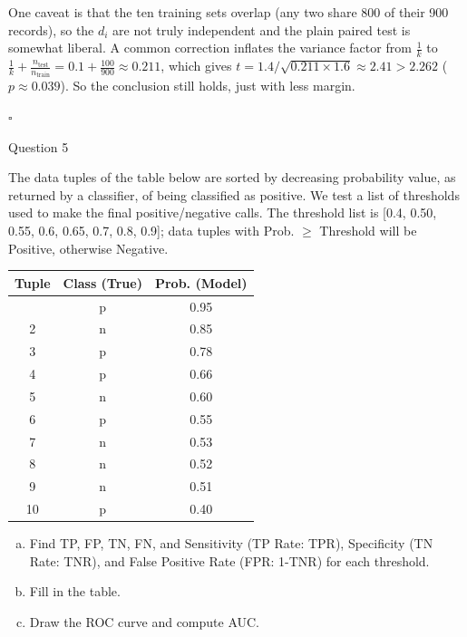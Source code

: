 \documentclass[12pt,letterpaper, onecolumn]{exam}
\begin{document}
\begin{questions}
\begin{solution}
\begin{enumerate}[1.]
            One caveat is that the ten training sets overlap (any two share 800 of their 900 records), so the $d_i$ are not truly independent and the plain paired test is somewhat liberal. A common correction inflates the variance factor from $\tfrac{1}{k}$ to $\tfrac{1}{k}+\tfrac{n_{\text{test}}}{n_{\text{train}}} = 0.1+\tfrac{100}{900}\approx 0.211$, which gives $t = 1.4/\sqrt{0.211\times 1.6}\approx 2.41 > 2.262$ ($p\approx 0.039$). So the conclusion still holds, just with less margin.
        \end{enumerate}

        $\square$
    \end{solution}

    \newpage
    \question[10] Question 5\droppoints

    The data tuples of the table below are sorted by decreasing probability value, as returned by a classifier, of being classified as positive. We test a list of thresholds used to make the final positive/negative calls. The threshold list is [0.4, 0.50, 0.55, 0.6, 0.65, 0.7, 0.8, 0.9]; data tuples with Prob. $\geq$ Threshold will be Positive, otherwise Negative.

    {\small
        \begin{longtable}{|c|c|c|}
            \hline Tuple & Class (True) & Prob. (Model) \\ \hline
            \endhead
            \hline
            \endfoot
            1 & p & 0.95 \\
            2 & n & 0.85 \\
            3 & p & 0.78 \\
            4 & p & 0.66 \\
            5 & n & 0.60 \\
            6 & p & 0.55 \\
            7 & n & 0.53 \\
            8 & n & 0.52 \\
            9 & n & 0.51 \\
            10 & p & 0.40
        \end{longtable}
        }

        \begin{enumerate}[a.)]
            \item Find TP, FP, TN, FN, and Sensitivity (TP Rate: TPR), Specificity (TN Rate: TNR), and False Positive Rate (FPR: 1-TNR) for each threshold.
            \item Fill in the table.
            \item Draw the ROC curve and compute AUC.
        \end{enumerate}


\end{questions}
\end{document}
